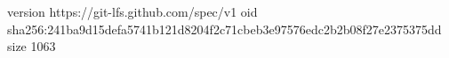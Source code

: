 version https://git-lfs.github.com/spec/v1
oid sha256:241ba9d15defa5741b121d8204f2c71cbeb3e97576edc2b2b08f27e2375375dd
size 1063
